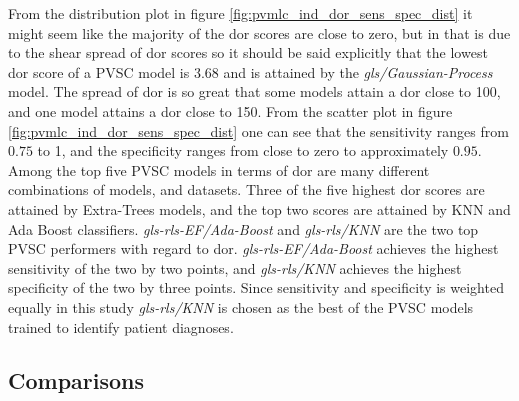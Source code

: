 From the distribution plot in figure \ref{fig:pvmlc_ind_dor_sens_spec_dist} it might seem like the majority of the \acrshort{dor} scores are close to zero, but in that is due to the shear spread of \acrshort{dor} scores so it should be said explicitly that the lowest \acrshort{dor} score of a PVSC model is 3.68 and is attained by the \textit{gls/Gaussian-Process} model. The spread of \acrshort{dor} is so great that some models attain a \acrshort{dor} close to 100, and one model attains a \acrshort{dor} close to 150. From the scatter plot in figure \ref{fig:pvmlc_ind_dor_sens_spec_dist} one can see that the sensitivity ranges from $0.75$ to 1, and the specificity ranges from close to zero to approximately $0.95$. Among the top five PVSC models in terms of \acrshort{dor} are many different combinations of models, and datasets. Three of the five highest \acrshort{dor} scores are attained by Extra-Trees models, and the top two scores are attained by KNN and Ada Boost classifiers. \textit{gls-rls-EF/Ada-Boost} and \textit{gls-rls/KNN} are the two top PVSC performers with regard to \acrshort{dor}. \textit{gls-rls-EF/Ada-Boost} achieves the highest sensitivity of the two by two points, and \textit{gls-rls/KNN} achieves the highest specificity of the two by three points. Since sensitivity and specificity is weighted equally in this study \textit{gls-rls/KNN} is chosen as the best of the PVSC models trained to identify patient diagnoses.

\newpage

\subsection{Comparisons}

